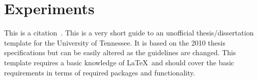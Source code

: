 \chapter{Experiments} \label{ch:chapter2}

This is a citation~\cite{utk:idr2016optimization}.
This is a very short guide to an unofficial thesis/dissertation template for the University of Tennessee. It is based on the 2010 thesis specifications but can be easily altered as the guidelines are changed. This template requires a basic knowledge of \LaTeX\ and should cover the basic requirements in terms of required packages and functionality.

